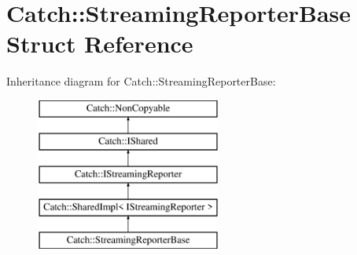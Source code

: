 \hypertarget{struct_catch_1_1_streaming_reporter_base}{\section{Catch\-:\-:Streaming\-Reporter\-Base Struct Reference}
\label{struct_catch_1_1_streaming_reporter_base}
}
Inheritance diagram for Catch\-:\-:Streaming\-Reporter\-Base\-:\begin{figure}[H]
\begin{center}
\leavevmode
\includegraphics[height=5.000000cm]{struct_catch_1_1_streaming_reporter_base}
\end{center}
\end{figure}
